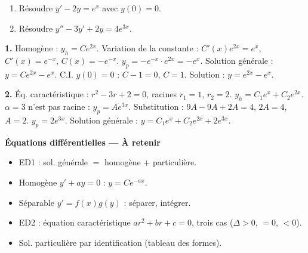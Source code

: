 \documentclass[11pt,a4paper,twoside]{book}
\begin{document}
\begin{center}
\end{center}

\begin{exercicebox}[ED1 complète et ED2]
\begin{enumerate}
  \item Résoudre $y' - 2y = e^x$ avec $y(0) = 0$.
  \item Résoudre $y'' - 3y' + 2y = 4e^{3x}$.
\end{enumerate}
\end{exercicebox}

\begin{correctionbox}[Correction]
\textbf{1.} Homogène : $y_h = Ce^{2x}$. Variation de la constante : $C'(x)e^{2x} = e^x$, $C'(x)=e^{-x}$, $C(x)=-e^{-x}$.
$y_p = -e^{-x}\cdot e^{2x} = -e^x$. Solution générale : $y = Ce^{2x} - e^x$.
C.I. $y(0)=0$ : $C-1=0$, $C=1$. Solution : $y=e^{2x}-e^x$.

\textbf{2.} Éq. caractéristique : $r^2-3r+2=0$, racines $r_1=1$, $r_2=2$.
$y_h = C_1 e^x + C_2 e^{2x}$.
$\alpha=3$ n'est pas racine : $y_p = Ae^{3x}$. Substitution : $9A-9A+2A = 4$, $2A=4$, $A=2$.
$y_p = 2e^{3x}$. Solution générale : $y = C_1 e^x + C_2 e^{2x} + 2e^{3x}$.
\end{correctionbox}

\begin{retenirbox}
\textbf{Équations différentielles — À retenir}
\begin{itemize}
  \item ED1 : sol. générale $=$ homogène $+$ particulière.
  \item Homogène $y'+ay=0$ : $y=Ce^{-ax}$.
  \item Séparable $y'=f(x)g(y)$ : séparer, intégrer.
  \item ED2 : équation caractéristique $ar^2+br+c=0$, trois cas ($\Delta>0$, $=0$, $<0$).
  \item Sol. particulière par identification (tableau des formes).
\end{itemize}
\end{retenirbox}
\end{document}
